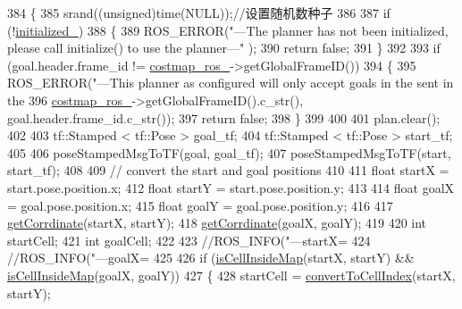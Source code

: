\begin{DoxyCode}
384 \{
385     srand((\textcolor{keywordtype}{unsigned})time(NULL));\textcolor{comment}{//设置随机数种子}
386 
387     \textcolor{keywordflow}{if} (!\hyperlink{classrrt__plan_1_1rrt__planner_ac1cd8655573adac056ae922a92337b8d}{initialized\_})
388     \{
389         ROS\_ERROR(\textcolor{stringliteral}{"---The planner has not been initialized, please call initialize() to use the planner---"}
      );
390         \textcolor{keywordflow}{return} \textcolor{keyword}{false};
391     \}
392 
393     \textcolor{keywordflow}{if} (goal.header.frame\_id != \hyperlink{classrrt__plan_1_1rrt__planner_a3dcf8908136ace532176511eb1861528}{costmap\_ros\_}->getGlobalFrameID())
394     \{
395         ROS\_ERROR(\textcolor{stringliteral}{"---This planner as configured will only accept goals in the %
       sent in the %
396                   \hyperlink{classrrt__plan_1_1rrt__planner_a3dcf8908136ace532176511eb1861528}{costmap\_ros\_}->getGlobalFrameID().c\_str(), goal.header.frame\_id.c\_str());
397         \textcolor{keywordflow}{return} \textcolor{keyword}{false};
398     \}
399 
400 
401     plan.clear();
402 
403     tf::Stamped < tf::Pose > goal\_tf;
404     tf::Stamped < tf::Pose > start\_tf;
405 
406     poseStampedMsgToTF(goal, goal\_tf);
407     poseStampedMsgToTF(start, start\_tf);
408 
409     \textcolor{comment}{// convert the start and goal positions}
410 
411     \textcolor{keywordtype}{float} startX = start.pose.position.x;
412     \textcolor{keywordtype}{float} startY = start.pose.position.y;
413 
414     \textcolor{keywordtype}{float} goalX = goal.pose.position.x;
415     \textcolor{keywordtype}{float} goalY = goal.pose.position.y;
416 
417     \hyperlink{classrrt__plan_1_1rrt__planner_a8f1fde39d2f3b01d7b2d11dc9482e1dc}{getCorrdinate}(startX, startY);
418     \hyperlink{classrrt__plan_1_1rrt__planner_a8f1fde39d2f3b01d7b2d11dc9482e1dc}{getCorrdinate}(goalX, goalY);
419 
420     \textcolor{keywordtype}{int} startCell;
421     \textcolor{keywordtype}{int} goalCell;
422 
423     \textcolor{comment}{//ROS\_INFO("---startX=%
424     \textcolor{comment}{//ROS\_INFO("---goalX=%
425 
426     \textcolor{keywordflow}{if} (\hyperlink{classrrt__plan_1_1rrt__planner_a07347499c296c693631f24dfb1cb4196}{isCellInsideMap}(startX, startY) && \hyperlink{classrrt__plan_1_1rrt__planner_a07347499c296c693631f24dfb1cb4196}{isCellInsideMap}(goalX, goalY))
427     \{
428         startCell = \hyperlink{classrrt__plan_1_1rrt__planner_a2647265d06a792b983b372af52cf5677}{convertToCellIndex}(startX, startY);
}}}
\end{DoxyCode}
